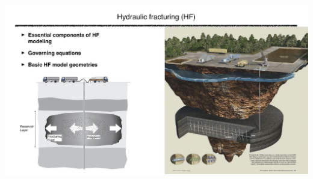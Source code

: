 \documentclass[main.tex]{subfiles}
\begin{document}
\includegraphics[width=\textwidth, page=29]{HF_slides.pdf}
\end{document}
